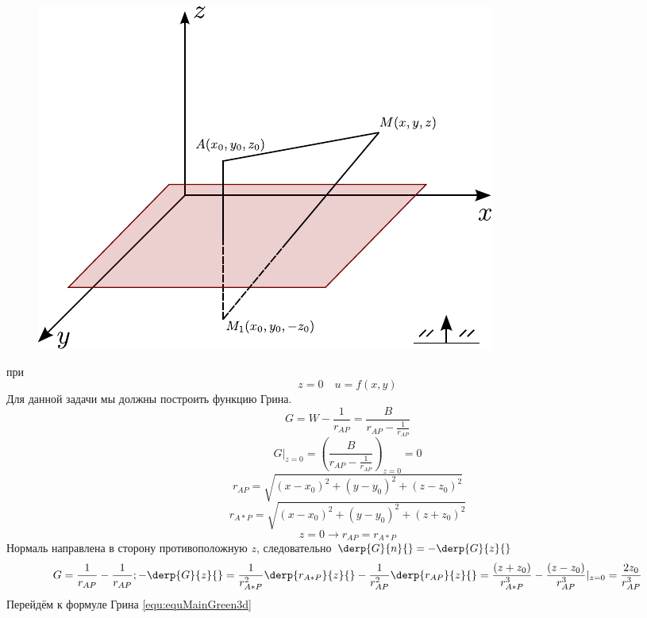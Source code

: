 \begin{figure}[h!]
	\centering	
	\includegraphics[scale=0.5]{figHalfSpatial.pdf}
\end{figure}
	при \[
	z = 0 \quad u = f(x, y)
\]
	Для данной задачи мы должны построить функцию Грина.
\[
	G = W - \frac{1}{r_{AP}} = \frac{B}{r_{AP} - \frac{1}{r_{AP}}}
\]
\[
	G|_{z = 0} = \left(\frac{B}{r_{AP} - \frac{1}{r_{AP}}} \right)_{z = 0} = 0
\]
\[
	r_{AP} = \sqrt{(x - x_0)^2 + (y - y_0)^2 + (z - z_0)^2}
\]
\[
	r_{A*P} = \sqrt{(x - x_0)^2 + (y - y_0)^2 + (z + z_0)^2}
\]
\[
	z = 0 \to r_{AP} = r_{A*P}
\]
Нормаль направлена в сторону противоположную $z$, следовательно $\derp{G}{n}{} = - \derp{G}{z}{}$
\[
	G = \frac{1}{r_{AP}} - \frac{1}{r_{AP}}; - \derp{G}{z}{} = \frac{1}{r_{A*P}^2} \derp{r_{A*P}}{z}{} - \frac{1}{r_{AP}^2} \derp{r_{AP}}{z}{} = \frac{(z + z_0)}{r_{A*P}^3} - \frac{(z - z_0)}{r_{AP}^3} |_{z = 0} = \frac{2 z_0}{r_{AP}^3}
\]
Перейдём к формуле Грина \eqref{equ:equMainGreen3d}
	
